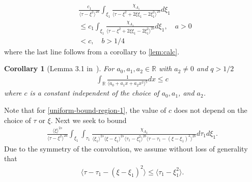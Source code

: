 \documentclass[12pt,reqno]{amsart}
\numberwithin{equation}{section}  %
\newcommand{\rr}{\mathbb{R}}
\newtheorem{corollary}[theorem]{Corollary}
\begin{document}
\begin{equation}
  \label{uniform-bound-region-1}
\begin{split}
  & \frac{c_{1}}{\langle \tau - \xi^{2} \rangle^{2a}} \int_{\xi_{1}}
  \frac{\chi_{A_{1}}}{\langle \tau - \xi^{2} + 2 \xi \xi_{1} - 2
  \xi_{1}^{2} \rangle^{2b} } d \xi_{1}
  \\
  & \le c_{1} \int_{\xi_{1}}
  \frac{\chi_{A_{1}}}{\langle \tau - \xi^{2} + 2 \xi \xi_{1} - 2
  \xi_{1}^{2} \rangle^{2b} } d \xi_{1}, \quad a > 0
  \\
& < c, \quad b > 1/4
\end{split}
\end{equation}
%
%
where the last line follows from a corollary to \cref{lem:calc}.
%
%
%
%
%
%
%
%
\begin{corollary}[Lemma 3.1 in~\cite{Farah:2009uq}]
  For $a_{0}, a_{1}, a_{2} \in \rr$ with $a_{2} \neq 0$ and $q > 1/2$
  \begin{equation*}
  \begin{split}
    \int_{\rr} \frac{1}{\langle a_{0} + a_{1}x + a_{2}x^{2} \rangle ^{q}} dx \le c
  \end{split}
  \end{equation*}
  where $c$ is a constant independent of the choice of $a_{0}, a_{1}$, and $a_{2}$.
\label{cor:integral-bound}
\end{corollary}
Note that for \eqref{uniform-bound-region-1}, the
value of $c$ does not depend on the choice of $\tau$ or $\xi$. 
Next we seek to bound
\begin{equation}
  \label{case-1-region-2}
  \begin{split}
    \frac{ \langle \xi
    \rangle ^{2s}}{\langle \tau - \xi^{2} \rangle ^{2a}}
    \int_{\xi_{1}} \int_{\tau_{1}} \frac{\chi_{A_{2}}}{ \langle \xi_{1} \rangle ^{2s} \langle \xi-\xi_{1} \rangle ^{2s} 
    \langle \tau_{1} - \xi_{1}^{2} \rangle^{2b} \langle  \tau - \tau_{1} -
    (\xi - \xi_{1})^{2} \rangle^{2b} }
    d \tau_1 d \xi_{1}.
  \end{split}
\end{equation}
Due to the symmetry of the convolution, we assume without loss of generality that
%
%
\begin{equation*}
\begin{split}
  \langle \tau - \tau_{1} - (\xi - \xi_{1})^{2} \rangle \le \langle
  \tau_{1} - \xi_{1}^{2}\rangle.
\end{split}
\end{equation*}
\end{document}
